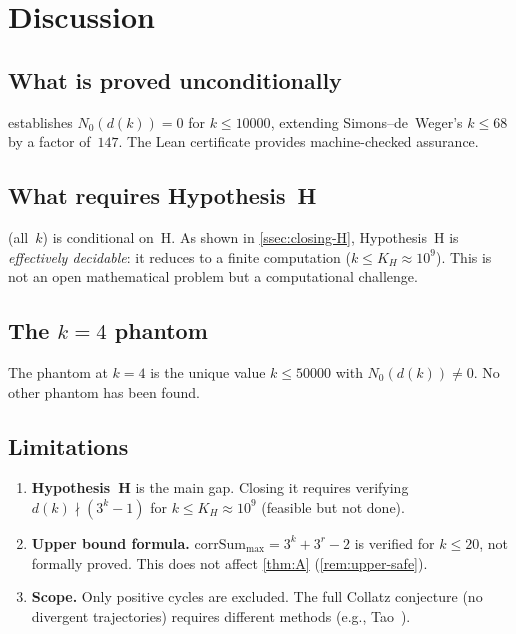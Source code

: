 \documentclass[11pt, a4paper]{amsart}
\theoremstyle{plain}
\theoremstyle{definition}
\theoremstyle{remark}
\newcommand{\corrSum}{\mathrm{corrSum}}
\begin{document}
\section{Discussion}\label{sec:discussion}

\subsection{What is proved unconditionally}\label{ssec:unconditional}

 establishes $N_0(d(k)) = 0$ for
$k \leq 10000$, extending Simons--de~Weger's $k \leq 68$
by a factor of~$147$.  The Lean certificate provides
machine-checked assurance.

\subsection{What requires Hypothesis~H}\label{ssec:conditional}

 (all~$k$) is conditional on~H.
As shown in \cref{ssec:closing-H}, Hypothesis~H is
\emph{effectively decidable}: it reduces to a finite
computation ($k \leq K_H \approx 10^9$).
This is not an open mathematical problem but a computational
challenge.

\subsection{The $k = 4$ phantom}\label{ssec:phantom}

The phantom at $k = 4$ is the unique value
$k \leq 50000$ with $N_0(d(k)) \neq 0$.
No other phantom has been found.

\subsection{Limitations}\label{ssec:limits}

\begin{enumerate}
  \item \textbf{Hypothesis~H} is the main gap.
    Closing it requires verifying $d(k) \nmid (3^k-1)$
    for $k \leq K_H \approx 10^9$ (feasible but not done).
  \item \textbf{Upper bound formula.}
    $\corrSum_{\max} = 3^k + 3^r - 2$ is verified for
    $k \leq 20$, not formally proved.
    This does not affect \cref{thm:A}
    (\cref{rem:upper-safe}).
  \item \textbf{Scope.}
    Only positive cycles are excluded.
    The full Collatz conjecture (no divergent trajectories)
    requires different methods
    (e.g., Tao~\cite{Tao2022}).
\end{enumerate}
\end{document}
